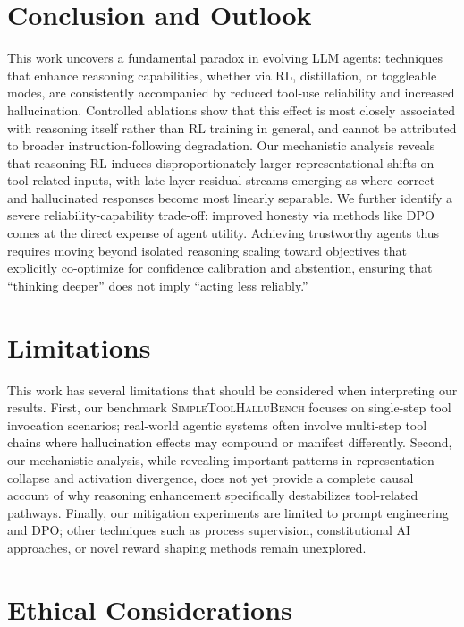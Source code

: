 \documentclass[11pt]{article}
\begin{document}
\section{Conclusion and Outlook}

This work uncovers a fundamental paradox in evolving LLM agents: techniques that enhance reasoning capabilities, whether via RL, distillation, or toggleable modes, are consistently accompanied by reduced tool-use reliability and increased hallucination. Controlled ablations show that this effect is most closely associated with reasoning itself rather than RL training in general, and cannot be attributed to broader instruction-following degradation. Our mechanistic analysis reveals that reasoning RL induces disproportionately larger representational shifts on tool-related inputs, with late-layer residual streams emerging as where correct and hallucinated responses become most linearly separable. We further identify a severe reliability-capability trade-off: improved honesty via methods like DPO comes at the direct expense of agent utility. Achieving trustworthy agents thus requires moving beyond isolated reasoning scaling toward objectives that explicitly co-optimize for confidence calibration and abstention, ensuring that ``thinking deeper'' does not imply ``acting less reliably.''

\section*{Limitations}

This work has several limitations that should be considered when interpreting our results. First, our benchmark \textsc{SimpleToolHalluBench} focuses on single-step tool invocation scenarios; real-world agentic systems often involve multi-step tool chains where hallucination effects may compound or manifest differently. Second, our mechanistic analysis, while revealing important patterns in representation collapse and activation divergence, does not yet provide a complete causal account of why reasoning enhancement specifically destabilizes tool-related pathways. Finally, our mitigation experiments are limited to prompt engineering and DPO; other techniques such as process supervision, constitutional AI approaches, or novel reward shaping methods remain unexplored.

\section*{Ethical Considerations}
\end{document}
